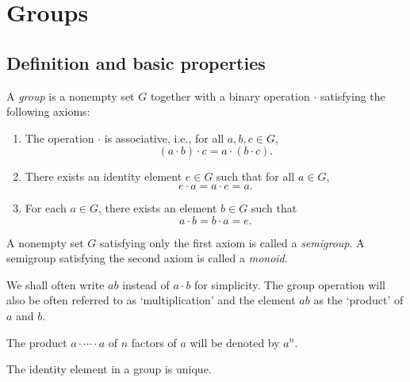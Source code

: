 \chapter{Groups}
\label{ch:groups}

\section{Definition and basic properties}

\begin{definition}
    A \emph{group} is a nonempty set \(G\) together with a binary operation \(\cdot\) satisfying the following axioms:
    \begin{enumerate}
        \item The operation \(\cdot\) is associative, i.e., for all \(a, b, c \in G\),
        \[
            (a \cdot b) \cdot c = a \cdot (b \cdot c).
        \]
        \item There exists an identity element \(e \in G\) such that for all \(a \in G\),
        \[
            e \cdot a = a \cdot e = a.
        \]
        \item For each \(a \in G\), there exists an element \(b \in G\) such that
        \[
            a \cdot b = b \cdot a = e.
        \]
    \end{enumerate}
\end{definition}

\begin{remark}
    A nonempty set \(G\) satisfying only the first axiom is called a \emph{semigroup}. A semigroup satisfying the second axiom is called a \emph{monoid}. 
\end{remark}

\begin{remark}
    We shall often write \(ab\) instead of \(a \cdot b\) for simplicity. The group operation will also be often referred to as `multiplication' and the element \(ab\) as the `product' of \(a\) and \(b\).
\end{remark}

\begin{notation}\label{notation:exponential}
    The product \(a \cdot \cdots \cdot a\) of \(n\) factors of \(a\) will be denoted by \(a^n\).
\end{notation}


\begin{theorem}
    The identity element in a group is unique.
\end{theorem}

